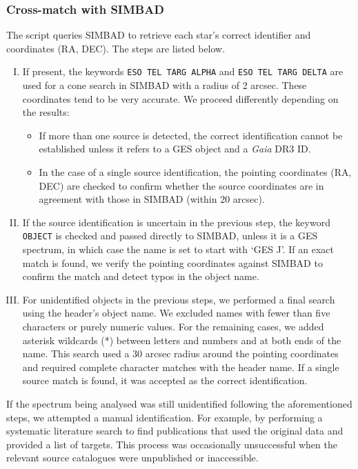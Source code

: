 \documentclass{aa}
\begin{document}
\subsubsection{Cross-match with SIMBAD}

The script queries SIMBAD to retrieve each star's correct identifier and coordinates (RA, DEC). The steps are listed below.

\begin{enumerate}[I.]
    \item If present, the keywords \texttt{ESO TEL TARG ALPHA} and \texttt{ESO TEL TARG DELTA} are used for a cone search in SIMBAD with a radius of 2 arcsec. These coordinates tend to be very accurate. We proceed differently depending on the results:
    
    \begin{itemize}
        \item If more than one source is detected, the correct identification cannot be established unless it refers to a GES object and a \textit{Gaia} DR3 ID.
        
        \item In the case of a single source identification, the pointing coordinates (RA, DEC) are checked to confirm whether the source coordinates are in agreement with those in SIMBAD (within 20 arcsec).
    \end{itemize}
        
    \item If the source identification is uncertain in the previous step, the keyword \texttt{OBJECT} is checked and passed directly to SIMBAD, unless it is a GES spectrum, in which case the name is set to start with `GES J'. If an exact match is found, we verify the pointing coordinates against SIMBAD to confirm the match and detect typos in the object name. 
    \item For unidentified objects in the previous steps, we performed a final search using the header's object name. We excluded names with fewer than five characters or purely numeric values. For the remaining cases, we added asterisk wildcards (*) between letters and numbers and at both ends of the name. This search used a 30 arcsec radius around the pointing coordinates and required complete character matches with the header name. If a single source match is found, it was accepted as the correct identification.
\end{enumerate}

If the spectrum being analysed was still unidentified following the aforementioned steps, we attempted a manual identification. For example, by performing a systematic literature search to find publications that used the original data and provided a list of targets. This process was occasionally unsuccessful when the relevant source catalogues were unpublished or inaccessible.
\end{document}
